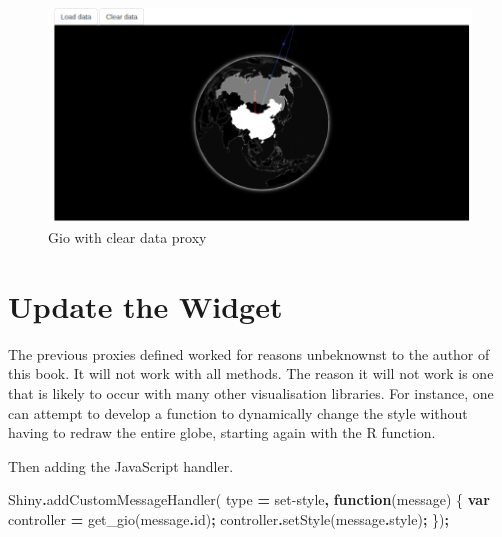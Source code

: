 \documentclass[
]{krantz}
\makeatletter
\newenvironment{Shaded}{\begin{snugshade}}{\end{snugshade}}
\newcommand{\AttributeTok}[1]{\textcolor[rgb]{0.61,0.61,0.61}{#1}}
\newcommand{\CommentTok}[1]{\textcolor[rgb]{0.37,0.37,0.37}{\textit{#1}}}
\newcommand{\ControlFlowTok}[1]{\textcolor[rgb]{0.27,0.27,0.27}{\textbf{#1}}}
\newcommand{\DataTypeTok}[1]{\textcolor[rgb]{0.27,0.27,0.27}{#1}}
\newcommand{\FunctionTok}[1]{\textcolor[rgb]{0,0,0}{#1}}
\newcommand{\KeywordTok}[1]{\textcolor[rgb]{0.27,0.27,0.27}{\textbf{#1}}}
\newcommand{\NormalTok}[1]{#1}
\newcommand{\OperatorTok}[1]{\textcolor[rgb]{0.43,0.43,0.43}{\textbf{#1}}}
\newcommand{\StringTok}[1]{\textcolor[rgb]{0.5,0.5,0.5}{#1}}
\newenvironment{kframe}{%
\medskip{}
\setlength{\fboxsep}{.8em}
 \def\at@end@of@kframe{}%
 \ifinner\ifhmode%
  \def\at@end@of@kframe{\end{minipage}}%
  \begin{minipage}{\columnwidth}%
 \fi\fi%
 \def\FrameCommand##1{\hskip\@totalleftmargin \hskip-\fboxsep
 \colorbox{shadecolor}{##1}\hskip-\fboxsep
     \hskip-\linewidth \hskip-\@totalleftmargin \hskip\columnwidth}%
 \MakeFramed {\advance\hsize-\width
   \@totalleftmargin\z@ \linewidth\hsize
   \@setminipage}}%
 {\par\unskip\endMakeFramed%
 \at@end@of@kframe}
\renewenvironment{Shaded}{\begin{kframe}}{\end{kframe}}
\makeatother
\begin{document}
\begin{figure}
\centering
\includegraphics{images/gio-shiny-clear.png}
\caption{Gio with clear data proxy}
\end{figure}

\hypertarget{shiny-widgets-update}{%
\section{Update the Widget}\label{shiny-widgets-update}}

The previous proxies defined worked for reasons unbeknownst to the author of this book. It will not work with all methods. The reason it will not work is one that is likely to occur with many other visualisation libraries. For instance, one can attempt to develop a function to dynamically change the style without having to redraw the entire globe, starting again with the R function.

\begin{Shaded}
\end{Shaded}

Then adding the JavaScript handler.

\begin{Shaded}
\begin{Highlighting}[]
\NormalTok{Shiny}\OperatorTok{.}\FunctionTok{addCustomMessageHandler}\NormalTok{(}
\NormalTok{  type }\OperatorTok{=} \StringTok{\textquotesingle{}set{-}style\textquotesingle{}}\OperatorTok{,} \KeywordTok{function}\NormalTok{(message) \{}
    \KeywordTok{var}\NormalTok{ controller }\OperatorTok{=}\NormalTok{ get\_gio(message}\OperatorTok{.}\AttributeTok{id}\NormalTok{)}\OperatorTok{;}
\NormalTok{    controller}\OperatorTok{.}\FunctionTok{setStyle}\NormalTok{(message}\OperatorTok{.}\AttributeTok{style}\NormalTok{)}\OperatorTok{;}
\NormalTok{\})}\OperatorTok{;}
\end{Highlighting}
\end{Shaded}
\end{document}
